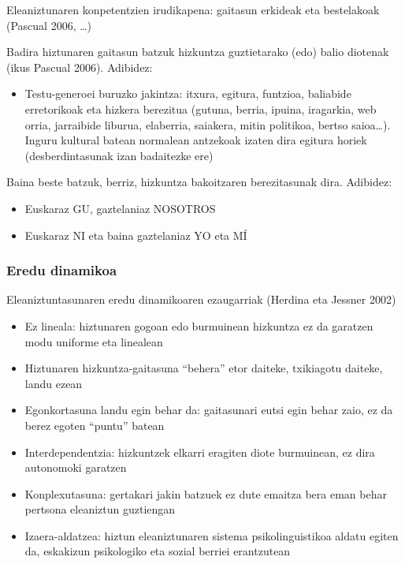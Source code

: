 \documentclass[
]{book}
\providecommand{\tightlist}{%
  \setlength{\itemsep}{0pt}\setlength{\parskip}{0pt}}
\begin{document}
Eleaniztunaren konpetentzien irudikapena: gaitasun erkideak eta bestelakoak (Pascual 2006, \ldots)

Badira hiztunaren gaitasun batzuk hizkuntza guztietarako (edo) balio diotenak (ikus Pascual 2006). Adibidez:

\begin{itemize}
\tightlist
\item
  Testu-generoei buruzko jakintza: itxura, egitura, funtzioa, baliabide erretorikoak eta hizkera berezitua (gutuna, berria, ipuina, iragarkia, web orria, jarraibide liburua, elaberria, saiakera, mitin politikoa, bertso saioa\ldots). Inguru kultural batean normalean antzekoak izaten dira egitura horiek (desberdintasunak izan badaitezke ere)
\end{itemize}

Baina beste batzuk, berriz, hizkuntza bakoitzaren berezitasunak dira. Adibidez:

\begin{itemize}
\tightlist
\item
  Euskaraz GU, gaztelaniaz NOSOTROS
\item
  Euskaraz NI eta baina gaztelaniaz YO eta MÍ
\end{itemize}

\hypertarget{eredu-dinamikoa}{%
\subsubsection{Eredu dinamikoa}\label{eredu-dinamikoa}}

Eleaniztuntasunaren eredu dinamikoaren ezaugarriak (Herdina eta Jessner 2002)

\begin{itemize}
\tightlist
\item
  Ez lineala: hiztunaren gogoan edo burmuinean hizkuntza ez da garatzen modu uniforme eta linealean
\item
  Hiztunaren hizkuntza-gaitasuna ``behera'' etor daiteke, txikiagotu daiteke, landu ezean
\item
  Egonkortasuna landu egin behar da: gaitasunari eutsi egin behar zaio, ez da berez egoten ``puntu'' batean
\item
  Interdependentzia: hizkuntzek elkarri eragiten diote burmuinean, ez dira autonomoki garatzen
\item
  Konplexutasuna: gertakari jakin batzuek ez dute emaitza bera eman behar pertsona eleaniztun guztiengan
\item
  Izaera-aldatzea: hiztun eleaniztunaren sistema psikolinguistikoa aldatu egiten da, eskakizun psikologiko eta sozial berriei erantzutean
\end{itemize}
\end{document}
